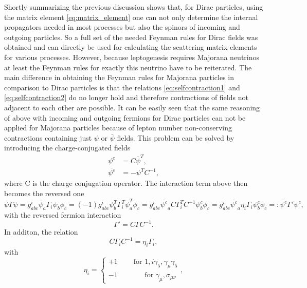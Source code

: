Shortly summarizing the previous discussion shows that, for Dirac particles, using the matrix element \eqref{eq:matrix_element} one can not only determine the internal propagators needed in most processes but also the spinors of incoming and outgoing particles. So a full set of the needed Feynman rules for Dirac fields was obtained and can directly be used for calculating the scattering matrix elements for various processes. \newline\indent
However, because leptogenesis requires Majorana neutrinos at least the Feynman rules for exactly this neutrino have to be reiterated. The main difference in obtaining the Feynman rules for Majorana particles in comparison to Dirac particles is that the relations \eqref{eq:selfcontraction1} and \eqref{eq:selfcontraction2} do no longer hold and therefore contractions of fields not adjacent to each other are possible. It can be easily seen that the same reasoning of above with incoming and outgoing fermions for Dirac particles can not be applied for Majorana particles because of lepton number non-conserving contractions containing just $\psi$ or $\bar{\psi}$ fields.\newline\indent
This problem can be solved by introducing the charge-conjugated fields 
\begin{align*}
	\psi^c&=C\bar{\psi}^T,\\
	\overline{\psi^c}&=-\psi^T C^{-1},
\end{align*}
where C is the charge conjugation operator. The interaction term above then becomes the reversed one
\begin{equation*}
		\bar{\psi}\Gamma\psi=g^i_{abc}\bar{\psi}_a\Gamma_i\psi_b\phi_c=(-1)g^i_{abc}\psi_b^T\Gamma_i^T\bar{\psi}_a^T\phi_c=g^i_{abc}\overline{\psi^c}_aC\Gamma_i^TC^{-1}\psi^c_b\phi_c=g^i_{abc}\overline{\psi^c}_a\eta_i\Gamma_i\psi^c_b\phi_c=:\overline{\psi^c}\Gamma'\psi^c,
\end{equation*}
with the reversed fermion interaction
\begin{equation*}
	\Gamma'=C\Gamma C^{-1}.
\end{equation*}
In additon, the relation
\begin{equation*}
	C\Gamma_i C^{-1}=\eta_i\Gamma_i,
\end{equation*}
with 
\begin{equation*}
	\eta_i=\left\{\begin{array}{c}+1\:\:\:\:\:\:\:\:\:\:\text{for } 1,i\gamma_5,\gamma_\mu\gamma_5\\-1\:\:\:\:\:\:\:\:\:\:\:\:\:\:\:\:\:\text{for }\gamma_\mu,\sigma_{\mu\nu}\end{array}\right.,
\end{equation*}
